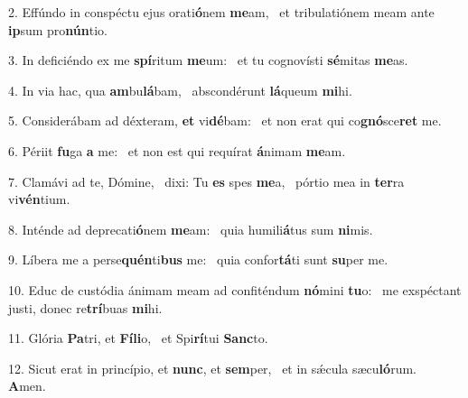 2. Effúndo in conspéctu ejus orati\textbf{ó}nem \textbf{me}am, \ast\  et tribulatiónem meam ante \textbf{ip}sum pro\textbf{nún}tio.\

3. In deficiéndo ex me \textbf{spí}ritum \textbf{me}um: \ast\  et tu cognovísti \textbf{sé}mitas \textbf{me}as.\

4. In via hac, qua \textbf{am}bu\textbf{lá}bam, \ast\  abscondérunt \textbf{lá}queum \textbf{mi}hi.\

5. Considerábam ad déxteram, \textbf{et} vi\textbf{dé}bam: \ast\  et non erat qui co\textbf{gnó}sce\textbf{ret} me.\

6. Périit \textbf{fu}ga \textbf{a} me: \ast\  et non est qui requírat \textbf{á}nimam \textbf{me}am.\

7. Clamávi ad te, Dómine, \dag\  dixi: Tu \textbf{es} spes \textbf{me}a, \ast\  pórtio mea in \textbf{ter}ra vi\textbf{vén}tium.\

8. Inténde ad deprecati\textbf{ó}nem \textbf{me}am: \ast\  quia humili\textbf{á}tus sum \textbf{ni}mis.\

9. Líbera me a perse\textbf{quén}ti\textbf{bus} me: \ast\  quia confor\textbf{tá}ti sunt \textbf{su}per me.\

10. Educ de custódia ánimam meam ad confiténdum \textbf{nó}mini \textbf{tu}o: \ast\  me exspéctant justi, donec re\textbf{trí}buas \textbf{mi}hi.\

11. Glória \textbf{Pa}tri, et \textbf{Fí}\textbf{li}o, \ast\  et Spi\textbf{rí}tui \textbf{Sanc}to.\

12. Sicut erat in princípio, et \textbf{nunc}, et \textbf{sem}per, \ast\  et in sǽcula sæcu\textbf{ló}rum. \textbf{A}men.\

